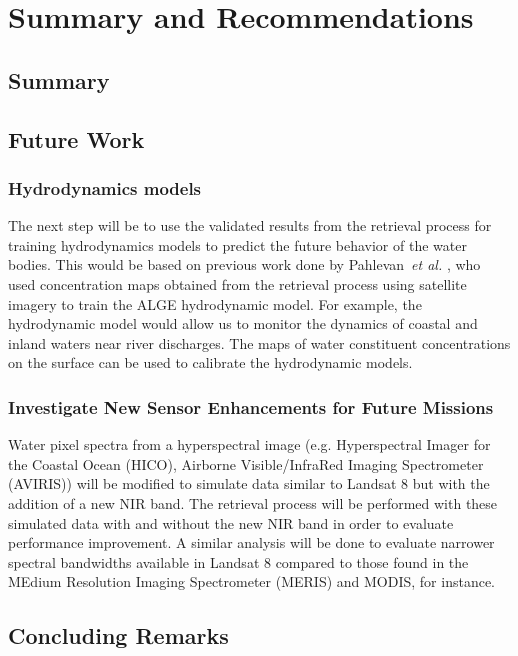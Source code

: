 \chapter{Summary and Recommendations}
\section{Summary}
\section{Future Work}
\subsection{Hydrodynamics models} 
The next step will be to use the validated results from the retrieval process for training hydrodynamics models to predict the future behavior of the water bodies. This would be based on previous work done by Pahlevan~{\it et al.} \cite{Pahlevan:2012b}, who used concentration maps obtained from the retrieval process using satellite imagery to train the ALGE hydrodynamic model. For example, the hydrodynamic model would allow us to monitor the dynamics of coastal and inland waters near river discharges. The maps of water constituent concentrations on the surface can be used to calibrate the hydrodynamic models.

\subsection{Investigate New Sensor Enhancements for Future Missions}
Water pixel spectra from a hyperspectral image (e.g. Hyperspectral Imager for the Coastal Ocean (HICO),  Airborne Visible/InfraRed Imaging Spectrometer (AVIRIS)) will be modified to simulate data similar to Landsat 8 but with the addition of a new NIR band. The retrieval process will be performed with these simulated data with and without the new NIR band in order to evaluate performance improvement. A similar analysis will be done to evaluate narrower spectral bandwidths available in Landsat 8 compared to those found in the MEdium Resolution Imaging Spectrometer (MERIS) and MODIS, for instance. 

\section{Concluding Remarks}
